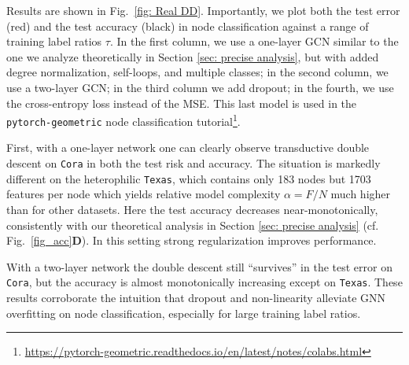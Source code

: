 \documentclass[9pt,twocolumn]{pnas-new}
\begin{document}
Results are shown in Fig.~\ref{fig: Real DD}. Importantly, we plot both the test error (red) and the test accuracy (black) in node classification against a range of training label ratios $\tau$. In the first column, we use a one-layer GCN similar to the one we analyze theoretically in Section \ref{sec: precise analysis}, but with added degree normalization, self-loops, and multiple classes; in the second column, we use a two-layer GCN; in the third column we add dropout; in the fourth, we use the cross-entropy loss instead of the MSE.
%
This last model is used in the \texttt{pytorch-geometric} node classification tutorial\footnote{\href{https://pytorch-geometric.readthedocs.io/en/latest/notes/colabs.html}{https://pytorch-geometric.readthedocs.io/en/latest/notes/colabs.html}}.

First, with a one-layer network one can clearly observe transductive double descent on \texttt{Cora} in both the test risk and accuracy. The situation is markedly different on the heterophilic \texttt{Texas}, which contains only 183 nodes but 1703 features per node which yields relative model complexity $\alpha=F/N$ much higher than for other datasets. Here the test accuracy decreases near-monotonically, consistently with our theoretical analysis in Section \ref{sec: precise analysis} (cf. Fig.~\ref{fig_acc}\textbf{\textsf{D}}). In this setting strong regularization improves performance.

With a two-layer network the double descent still ``survives'' in the test error on \texttt{Cora}, but the accuracy is almost monotonically increasing except on \texttt{Texas}. These results corroborate the intuition that dropout and non-linearity alleviate GNN overfitting on node classification, especially for large training label ratios.
\end{document}
